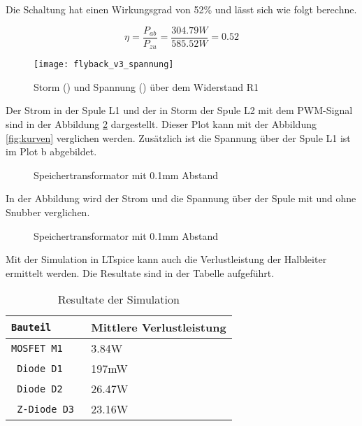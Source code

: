 Die Schaltung hat einen Wirkungsgrad von 52\% und lässt sich wie folgt berechne. 

\begin{equation}\label{eq:wirkungsgrand}
\eta=\frac{P_{ab}}{P_{zu}}=\frac{304.79W}{585.52W} = 0.52
\end{equation}

\begin{figure}[H]
	\centering
	\texttt{[image: flyback\_v3\_spannung]}
	\caption{Storm () und Spannung () über dem Widerstand R1 }\label{fig:ausgangsstrom}
\end{figure}

Der Strom in der Spule L1 und der in Storm der Spule L2 mit dem PWM-Signal sind in der Abbildung \ref{fig:spule} dargestellt. Dieser Plot kann mit der Abbildung \ref{fig:kurven} verglichen werden. Zusätzlich ist die Spannung über der Spule L1 ist im Plot b abgebildet.

\begin{figure}[H]
	\centering
	\qquad
	\caption{Speichertransformator mit 0.1mm Abstand}
	\label{fig:spule}
\end{figure}

In der Abbildung wird der Strom und die Spannung über der Spule mit und ohne Snubber verglichen.

\begin{figure}[H]
	\centering
	\qquad
	\caption{Speichertransformator mit 0.1mm Abstand}
	\label{fig:LT_snubber}
\end{figure}

Mit der Simulation in LTspice kann auch die Verlustleistung der Halbleiter ermittelt werden. Die Resultate sind in der Tabelle aufgeführt.

\begin{table}[h]
	\centering
	\begin{tabular}{>{\tt}C{2.3cm}| C{6cm}} 
		\normalfont\textbf{Bauteil} & \normalfont\textbf{Mittlere Verlustleistung} \\ \hline\hline 
		MOSFET M1 & 3.84W  \\ \hline
		Diode D1 & 197mW  \\ \hline
		Diode D2 & 26.47W \\ \hline
		Z-Diode D3 & 23.16W  \\ \hline
	\end{tabular}
	\caption{Resultate der Simulation}
	\label{tab:LT_verlsutleistung}
\end{table}

